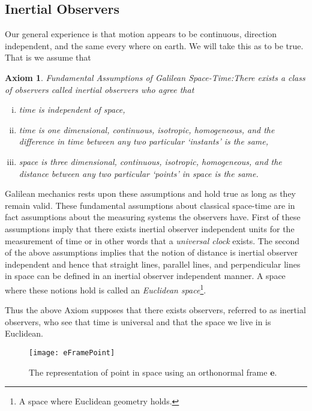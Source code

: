 \documentclass[graybox,envcountchap,sectrefs]{svmonoMuga}
\newtheorem{axiom}{Axiom}[chapter]
\begin{document}
\subsection{Inertial Observers}
Our general experience is that motion appears to be continuous, direction independent, and the same every where on earth. We will take this as to be true. 
That is we assume that
\begin{svgraybox}
\begin{axiom}{\sf Fundamental Assumptions of Galilean Space-Time:}\label{ax:GalileanSpaceTime} 
There exists a class of observers called \textit{inertial observers} who agree that
\begin{enumerate}[(i)]
\item time is independent of space,
\item time is one dimensional, continuous, isotropic, homogeneous, and the difference in time between any two particular `instants' is the same,
\item space is three dimensional, continuous, isotropic, homogeneous, and the distance between any two particular `points' in space is the same.
\end{enumerate}
\end{axiom}
\end{svgraybox}
Galilean mechanics rests upon these assumptions and hold true as long as they remain valid.
These fundamental assumptions about classical space-time are in fact assumptions about the measuring systems the observers have. First of these assumptions imply that there exists inertial observer independent units for the measurement of time or in other words that a \emph{universal clock} exists. The second of the above assumptions implies that the notion of distance is inertial observer independent and hence that straight lines, parallel lines, and perpendicular lines in space can be defined in an inertial observer independent manner. A space where these notions hold is called an \textit{Euclidean space}\footnote{A space where Euclidean geometry holds.}. 
\begin{svgraybox}
Thus the above Axiom supposes that there exists observers, referred to as inertial observers, who see that time is universal and that the space we live in is Euclidean.
\end{svgraybox} 


\begin{figure}[ht]
\begin{center}
\texttt{[image: eFramePoint]}
\renewcommand{\baselinestretch}{1}\selectfont
\caption{The representation of point in space using an orthonormal frame $\mathbf{e}$.}
\label{Fig:PointDefn}
\renewcommand{\baselinestretch}{1.5}\selectfont
\end{center}
\end{figure}
\end{document}
